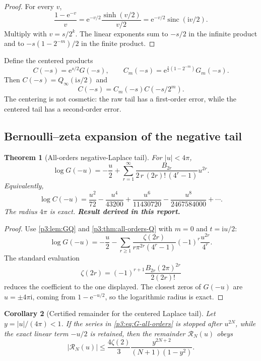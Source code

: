 \documentclass[11pt,oneside]{article}
\numberwithin{equation}{section}
\newtheorem{theorem}{Theorem}[section]
\newtheorem{corollary}[theorem]{Corollary}
\theoremstyle{definition}
\theoremstyle{remark}
\newcommand{\sinc}{\operatorname{sinc}}
\newcommand{\e}{\mathrm e}
\newcommand{\ii}{\mathrm i}
\newcommand{\newresult}{\textbf{Result derived in this report.}}
\begin{document}
\begin{proof}
For every $v$,
\[
 \frac{1-\e^{-v}}{v}=\e^{-v/2}\frac{\sinh(v/2)}{v/2}
 =\e^{-v/2}\sinc(\ii v/2).
\]
Multiply with $v=s/2^k$.  The linear exponents sum to $-s/2$ in the infinite product and to
$-s(1-2^{-m})/2$ in the finite product.
\end{proof}

Define the centered products
\begin{equation}
 C(-s)=\e^{s/2}G(-s),\qquad
 C_m(-s)=\e^{\frac{s}{2}(1-2^{-m})}G_m(-s).
 \label{p3:eq:centered-G}
\end{equation}
Then $C(-s)=Q_\infty(\ii s/2)$ and
\begin{equation}
 C(-s)=C_m(-s)C(-s/2^m).
 \label{p3:eq:centered-tail}
\end{equation}
The centering is not cosmetic: the raw tail has a first-order error, while the centered tail
has a second-order error.

\subsection{Bernoulli--zeta expansion of the negative tail}

\begin{theorem}[All-orders negative-Laplace tail]
\label{p3:thm:G-all-orders}
For $|u|<4\pi$,
\begin{equation}
 \boxed{
 \log G(-u)
 =-\frac{u}{2}
 +\sum_{r=1}^{\infty}
 \frac{B_{2r}}{2\,r\,(2r)!\,(4^r-1)}u^{2r}.}
 \label{p3:eq:G-all-orders}
\end{equation}
Equivalently,
\begin{equation}
 \log C(-u)
 =\frac{u^2}{72}-\frac{u^4}{43200}
  +\frac{u^6}{11430720}-\frac{u^8}{2467584000}+\cdots.
 \label{p3:eq:C-first}
\end{equation}
The radius $4\pi$ is exact.
\newresult
\end{theorem}

\begin{proof}
Use \cref{p3:lem:GQ} and \cref{p3:thm:all-orders-Q} with $m=0$ and $t=\ii u/2$:
\[
 \log G(-u)=-\frac u2
 -\sum_{r\ge1}\frac{\zeta(2r)}{r\pi^{2r}(4^r-1)}
 (-1)^r\frac{u^{2r}}{4^r}.
\]
The standard evaluation
\[
 \zeta(2r)=(-1)^{r+1}\frac{B_{2r}(2\pi)^{2r}}{2(2r)!}
\]
reduces the coefficient to the one displayed.  The closest zeros of $G(-u)$ are
$u=\pm4\pi\ii$, coming from $1-\e^{-u/2}$, so the logarithmic radius is exact.
\end{proof}

\begin{corollary}[Certified remainder for the centered Laplace tail]
\label{p3:cor:G-remainder}
Let $y=|u|/(4\pi)<1$.  If the series in \eqref{p3:eq:G-all-orders} is stopped after $u^{2N}$,
while the exact linear term $-u/2$ is retained, then the remainder $\mathcal R_N(u)$ obeys
\begin{equation}
 |\mathcal R_N(u)|
 \le \frac{4\zeta(2)}{3}
 \frac{y^{2N+2}}{(N+1)(1-y^2)}.
 \label{p3:eq:G-rem}
\end{equation}
\end{corollary}
\end{document}
